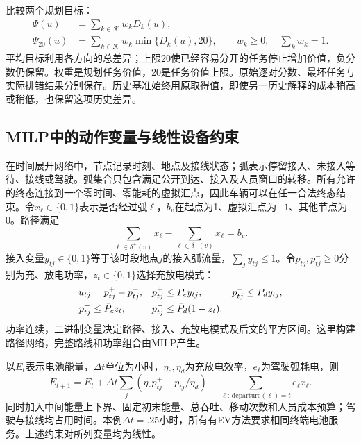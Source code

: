 \documentclass[UTF8,fontset=fandol,11pt,a4paper]{ctexart}
\begin{document}
比较两个规划目标：
\begin{equation}
 \begin{aligned}
 \Psi(u)&=\sum_{k\in\mathcal K}w_kD_k(u),\\
 \Psi_{20}(u)&=\sum_{k\in\mathcal K}w_k\min\{D_k(u),20\},
 \qquad w_k\ge0,\quad\sum_kw_k=1.
 \end{aligned}
 \label{eq:compact-objectives}
\end{equation}
平均目标利用各方向的总差异；上限20使已经容易分开的任务停止增加价值，负分数仍保留。权重是规划任务价值，20是任务价值上限。原始逐对分数、最坏任务与实际排错结果分别保存。历史基准始终用原取得值，即使另一历史解释的成本稍高或稍低，也保留这项历史差异。

\subsection{MILP中的动作变量与线性设备约束}
在时间展开网络中，节点记录时刻、地点及接线状态；弧表示停留接入、未接入等待、接线或驾驶。弧集合只包含满足公开到达、接入及人员窗口的转移。所有允许的终态连接到一个零时间、零能耗的虚拟汇点，因此车辆可以在任一合法终态结束。令$x_\ell\in\{0,1\}$表示是否经过弧$\ell$，$b_v$在起点为1、虚拟汇点为$-1$、其他节点为0。路径满足
\begin{equation}
 \sum_{\ell\in\delta^+(v)}x_\ell-
 \sum_{\ell\in\delta^-(v)}x_\ell=b_v.
 \label{eq:compact-flow}
\end{equation}
接入变量$y_{tj}\in\{0,1\}$等于该时段地点$j$的接入弧流量，$\sum_jy_{tj}\le1$。令$p^+_{tj},p^-_{tj}\ge0$分别为充、放电功率，$z_t\in\{0,1\}$选择充放电模式：
\begin{align}
 u_{tj}&=p^+_{tj}-p^-_{tj},&
 p^+_{tj}&\le\bar P_cy_{tj},&p^-_{tj}&\le\bar P_dy_{tj},\notag\\
 p^+_{tj}&\le\bar P_cz_t,&
 p^-_{tj}&\le\bar P_d(1-z_t).
 \label{eq:compact-power}
\end{align}
功率连续，二进制变量决定路径、接入、充放电模式及后文的平方区间。这里构建路径网络，完整路线和功率组合由MILP产生。

以$E_t$表示电池能量，$\Delta t$单位为小时，$\eta_c,\eta_d$为充放电效率，$e_\ell$为驾驶弧耗电，则
\begin{equation}
 E_{t+1}=E_t+\Delta t\sum_j
       (\eta_cp^+_{tj}-p^-_{tj}/\eta_d)
       -\sum_{\ell:\,\mathrm{departure}(\ell)=t}e_\ell x_\ell.
 \label{eq:compact-energy}
\end{equation}
同时加入中间能量上下界、固定初末能量、总吞吐、移动次数和人员成本预算；驾驶与接线均占用时间。本例$\Delta t=.25$小时，所有有EV方法要求相同终端电池服务。上述约束对所列变量均为线性。
\end{document}
